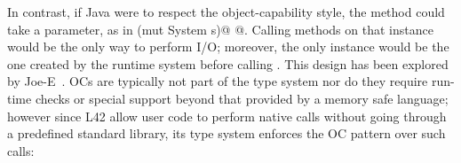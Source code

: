 In contrast, if Java were to respect the object-capability style, the \Q@main@ method could take a \Q@System@ parameter, as in
 \Q@main(mut System s)@
 \lstset{language=Java}
@.
Calling methods on that \Q@System@ instance would be the only way to perform I/O;
moreover, the only \Q@System@ instance would be the one created by the runtime system before calling \Q@main@. %
This design has been explored by Joe-E~\cite{finifter2008verifiable}.
\lstset{language=FortyTwo}
OCs are typically not part of the type system nor do they require run-time checks or special support beyond that provided by a memory safe language; however since
L42 allow user code to perform native calls without going through a predefined standard library, its type system enforces the OC pattern over such calls:
